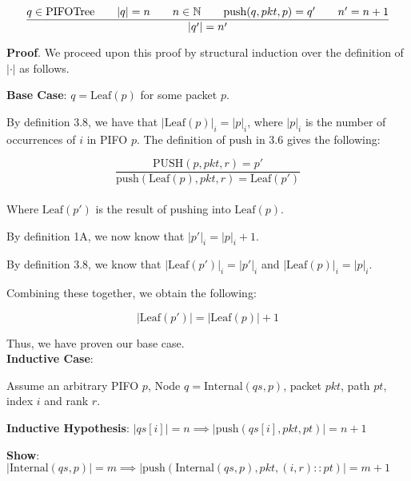 \documentclass{article}
\begin{document}
\par\

$$\frac{q \in \text{PIFOTree} \hspace{0.7cm} |q| = n \hspace{0.7cm} n \in \mathbb{N} \hspace{0.7cm} \text{push}(q, pkt, p) = q' \hspace{0.7cm} n' = n+1}{|q'| = n'}$$

\textbf{Proof}. We proceed upon this proof by structural induction over the definition of $|\cdot|$ as follows.\newline

\textbf{Base Case}: $q = \text{Leaf}(p)$ for some packet $p$.\newline

By definition 3.8, we have that $|\text{Leaf}(p)|_i = |p|_i$, where $|p|_i$ is the number of occurrences of $i$ in PIFO $p$. The definition of $\text{push}$ in 3.6 gives the following:

$$\frac{\text{PUSH}(p, pkt, r) = p'}{\text{push}(\text{Leaf}(p), pkt, r) = \text{Leaf}(p')}$$\\[-10pt]

Where $\text{Leaf}(p')$ is the result of $\text{push}$ing into $\text{Leaf}(p)$.\newline

By definition 1A, we now know that $|p'|_i = |p|_i + 1$.\newline

By definition 3.8, we know that $|\text{Leaf}(p')|_i = |p'|_i$ and $|\text{Leaf}(p)|_i = |p|_i$.\newline

Combining these together, we obtain the following:

$$|\text{Leaf}(p')| = |\text{Leaf}(p)| + 1$$

Thus, we have proven our base case.\\[10pt]

\textbf{Inductive Case}:\newline

Assume an arbitrary PIFO $p$, Node $q = \text{Internal}(qs, p)$, packet $pkt$, path $pt$, index $i$ and rank $r$.\newline

\textbf{Inductive Hypothesis}: $|qs[i]| = n \implies |\text{push}(qs[i], pkt, pt)| = n+1$\newline

\textbf{Show}: $|\text{Internal}(qs, p)| = m \implies |\text{push}(\text{Internal}(qs, p), pkt, (i, r) :: pt)| = m+1$\newline
\end{document}
